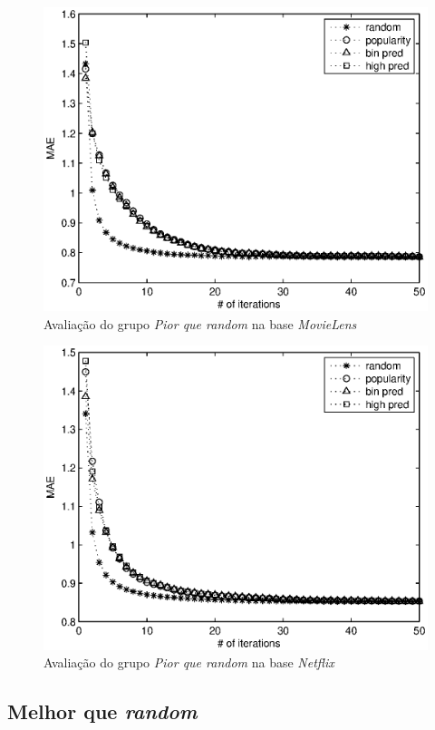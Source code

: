 \begin{figure}[ht]
\centering
\includegraphics{ml_bin_high.eps}
\caption{Avaliação do grupo \textit{Pior que random} na base \textit{MovieLens}}
\label{fig:worst-random-movielens}
\end{figure}

\begin{figure}[ht]
\centering
\includegraphics{nf_bin_high.eps}
\caption{Avaliação do grupo \textit{Pior que random} na base \textit{Netflix}}
\label{fig:worst-random-netflix}
\end{figure}

\subsection{Melhor que \textit{random}}
\label{sec:melhor-random}

